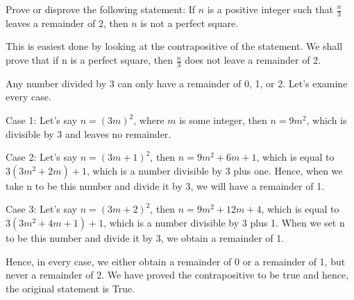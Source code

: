 \question Prove or disprove the following statement: If $n$ is a 
positive integer such that $\frac{n}{3}$ leaves a remainder of 2, 
then $n$ is not a perfect square.

\begin{solution}[3in]
This is easiest done by looking at the contrapositive of the statement.
We shall prove that if n is a perfect square, then $\frac{n}{3}$ does 
not leave a remainder of 2.\newline

 Any number divided by 3 can only have a remainder of 0, 1, or 2. 
 Let's examine every case.\newline

 Case 1: Let's say $n = (3m)^2$, where $m$ is some integer, then 
 $n = 9m^2$, which is divisible by 3 and leaves no remainder.\newline

 Case 2: Let's say $n = (3m + 1)^2$, then $n = 9m^2 + 6m + 1$, 
 which is equal to $3(3m^2 + 2m)+1$, which is a number divisible by 
 3 plus one. Hence, when we take n to be this number and divide it by 
 3, we will have a remainder of 1.\newline

 Case 3: Let's say $n = (3m + 2)^2$, then $n = 9m^2 + 12m + 4$, which 
 is equal to $3(3m^2 + 4m + 1) + 1$, which is a number divisible by 3 
 plus 1. When we set n to be this number and divide it by 3, we obtain 
 a remainder of 1.\newline

Hence, in every case, we either obtain a remainder of 0 or a remainder 
of 1, but never a remainder of 2. We have proved the contrapositive to 
be true and hence, the original statement is True.\newline

\end{solution}